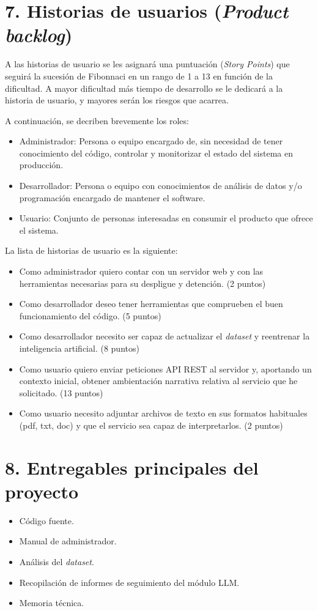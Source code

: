 \documentclass[
11pt, %
]{Clases/charter}
\begin{document}
\section{7. Historias de usuarios (\textit{Product backlog})}
\label{sec:backlog}
A las historias de usuario se les asignará una puntuación (\textit{Story Points}) que seguirá la sucesión de Fibonnaci en un rango de 1 a 13 en función de la dificultad.
A mayor dificultad más tiempo de desarrollo se le dedicará a la historia de usuario, y mayores serán los riesgos que acarrea.

A continuación, se decriben brevemente los roles:
\begin{itemize}
	\item Administrador: Persona o equipo encargado de, sin necesidad de tener conocimiento del código, controlar y monitorizar el estado del sistema en producción.
	\item Desarrollador: Persona o equipo con conocimientos de análisis de datos y/o programación encargado de mantener el software.
	\item Usuario: Conjunto de personas interesadas en consumir el producto que ofrece el sistema.
\end{itemize}

La lista de historias de usuario es la siguiente:
\begin{itemize}
	\item Como administrador quiero contar con un servidor web y con las herramientas necesarias para su despligue y detención. (2 puntos)
	\item Como desarrollador deseo tener herramientas que comprueben el buen funcionamiento del código. (5 puntos)
	\item Como desarrollador necesito ser capaz de actualizar el \textit{dataset} y reentrenar la inteligencia artificial. (8 puntos)
	\item Como usuario quiero enviar peticiones API REST al servidor y, aportando un contexto inicial, obtener ambientación narrativa relativa al servicio que he solicitado. (13 puntos)
	\item Como usuario necesito adjuntar archivos de texto en sus formatos habituales (pdf, txt, doc) y que el servicio sea capaz de interpretarlos. (2 puntos)
\end{itemize}


\section{8. Entregables principales del proyecto}
\label{sec:entregables}
\begin{itemize}
	\item Código fuente.
	\item Manual de administrador.
	\item Análisis del \textit{dataset}.
	\item Recopilación de informes de seguimiento del módulo LLM.
	\item Memoria técnica.
\end{itemize}
\end{document}
